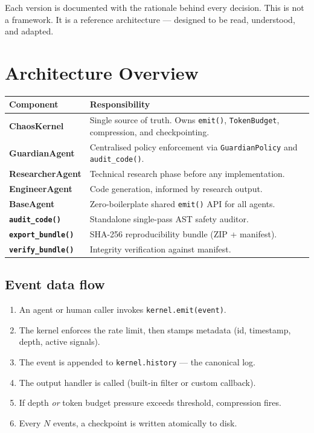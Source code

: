\documentclass[11pt, a4paper]{article}
\begin{document}
Each version is documented with the rationale behind every decision. This is not
a framework. It is a reference architecture — designed to be read, understood,
and adapted.

\section{Architecture Overview}

\begin{center}
\begin{tabular}{@{} >{\sffamily\bfseries}l p{9.5cm} @{}}
  \toprule
  Component        & Responsibility \\
  \midrule
  ChaosKernel      & Single source of truth. Owns \texttt{emit()}, \texttt{TokenBudget},
                     compression, and checkpointing. \\
  GuardianAgent    & Centralised policy enforcement via \texttt{GuardianPolicy} and
                     \texttt{audit\_code()}. \\
  ResearcherAgent  & Technical research phase before any implementation. \\
  EngineerAgent    & Code generation, informed by research output. \\
  BaseAgent        & Zero-boilerplate shared \texttt{emit()} API for all agents. \\
  \texttt{audit\_code()}   & Standalone single-pass AST safety auditor. \\
  \texttt{export\_bundle()} & SHA-256 reproducibility bundle (ZIP + manifest). \\
  \texttt{verify\_bundle()} & Integrity verification against manifest. \\
  \bottomrule
\end{tabular}
\end{center}

\subsection{Event data flow}

\begin{enumerate}
  \item An agent or human caller invokes \texttt{kernel.emit(event)}.
  \item The kernel enforces the rate limit, then stamps metadata
        (id, timestamp, depth, active signals).
  \item The event is appended to \texttt{kernel.history} — the canonical log.
  \item The output handler is called (built-in filter or custom callback).
  \item If depth \emph{or} token budget pressure exceeds threshold, compression fires.
  \item Every $N$ events, a checkpoint is written atomically to disk.
\end{enumerate}
\end{document}
